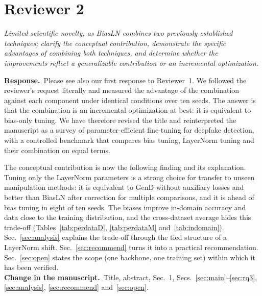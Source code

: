 \documentclass[11pt]{article}
\newenvironment{comment}{\par\medskip\noindent\begin{minipage}{\linewidth}\color{black!70}\itshape}{\end{minipage}\par\smallskip}
\newcommand{\resp}{\noindent\textbf{Response.}~}
\newcommand{\change}{\noindent\textbf{Change in the manuscript.}~}
\begin{document}
\section*{Reviewer 2}

\begin{comment}
Limited scientific novelty, as BiasLN combines two previously established techniques; clarify the conceptual contribution, demonstrate the specific advantages of combining both techniques, and determine whether the improvements reflect a generalizable contribution or an incremental optimization.
\end{comment}
\resp Please see also our first response to Reviewer~1. We followed the reviewer's request literally and measured the advantage of the combination against each component under identical conditions over ten seeds. The answer is that the combination is an incremental optimization at best: it is equivalent to bias-only tuning. We have therefore revised the title and reinterpreted the manuscript as a survey of parameter-efficient fine-tuning for deepfake detection, with a controlled benchmark that compares bias tuning, LayerNorm tuning and their combination on equal terms.

The conceptual contribution is now the following finding and its explanation. Tuning only the LayerNorm parameters is a strong choice for transfer to unseen manipulation methods: it is equivalent to GenD without auxiliary losses and better than BiasLN after correction for multiple comparisons, and it is ahead of bias tuning in eight of ten seeds. The biases improve in-domain accuracy and data close to the training distribution, and the cross-dataset average hides this trade-off (Tables~\ref{tab:perdataD}, \ref{tab:perdataM} and~\ref{tab:indomain}). Sec.~\ref{sec:analysis} explains the trade-off through the tied structure of a LayerNorm shift. Sec.~\ref{sec:recommend} turns it into a practical recommendation. Sec.~\ref{sec:open} states the scope (one backbone, one training set) within which it has been verified.\\
\change Title, abstract, Sec.~1, Secs.~\ref{sec:main}--\ref{sec:rq3}, \ref{sec:analysis}, \ref{sec:recommend} and~\ref{sec:open}.
\end{document}
